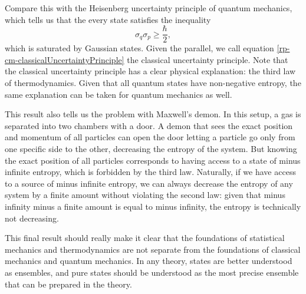 Compare this with the Heisenberg uncertainty principle of quantum mechanics, which tells us that the every state satisfies the inequality
\begin{equation}
	\sigma_q \sigma_p \geq \frac{\hbar}{2},
\end{equation}
which is saturated by Gaussian states. Given the parallel, we call equation \ref{rp-cm-classicalUncertaintyPrinciple} the classical uncertainty principle. Note that the classical uncertainty principle has a clear physical explanation: the third law of thermodynamics. Given that all quantum states have non-negative entropy, the same explanation can be taken for quantum mechanics as well.

This result also tells us the problem with Maxwell's demon. In this setup, a gas is separated into two chambers with a door. A demon that sees the exact position and momentum of all particles can open the door letting a particle go only from one specific side to the other, decreasing the entropy of the system. But knowing the exact position of all particles corresponds to having access to a state of minus infinite entropy, which is forbidden by the third law. Naturally, if we have access to a source of minus infinite entropy, we can always decrease the entropy of any system by a finite amount without violating the second law: given that minus infinity minus a finite amount is equal to minus infinity, the entropy is technically not decreasing.

This final result should really make it clear that the foundations of statistical mechanics and thermodynamics are not separate from the foundations of classical mechanics and quantum mechanics. In any theory, states are better understood as ensembles, and pure states should be understood as the most precise ensemble that can be prepared in the theory.

